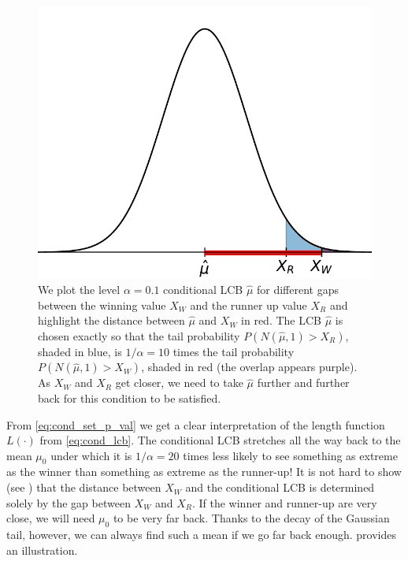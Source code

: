 \documentclass{article}
\begin{document}
\begin{figure}[]
{\begin{minipage}{0.33\textwidth}
    \end{minipage}\hfill
    \hspace{0.02\textwidth}
    \begin{minipage}{0.33\textwidth}
        \centering
        \includegraphics[width=\textwidth]{tail_prob_3.pdf}
    \end{minipage}
    }
    \caption{We plot the level $\alpha=0.1$ conditional LCB $\hat{\mu}$ for different gaps between the winning value $X_W$ and the runner up value $X_R$ and highlight the distance between $\hat{\mu}$ and $X_W$ in red. The LCB $\hat{\mu}$ is chosen exactly so that the tail probability $P(N(\hat{\mu}, 1) > X_R)$, shaded in blue, is $1/\alpha=10$ times the tail probability $P(N(\hat{\mu}, 1) > X_W)$, shaded in red (the overlap appears purple). As $X_W$ and $X_R$ get closer, we need to take $\hat{\mu}$ further and further back for this condition to be satisfied.}
    \label{fig:tail_prob}
\end{figure}

From \eqref{eq:cond_set_p_val} we get a clear interpretation of the length function $L(\cdot)$ from \eqref{eq:cond_lcb}. The conditional LCB stretches all the way back to the mean $\mu_0$ under which it is $1/\alpha = 20$ times less likely to see something as extreme as the winner than something as extreme as the runner-up! It is not hard to show (see ) that the distance between $X_W$ and the conditional LCB is determined solely by the gap between $X_W$ and $X_R$. If the winner and runner-up are very close, we will need $\mu_0$ to be very far back. Thanks to the decay of the Gaussian tail, however, we can always find such a mean if we go far back enough.  provides an illustration. 
\end{document}
